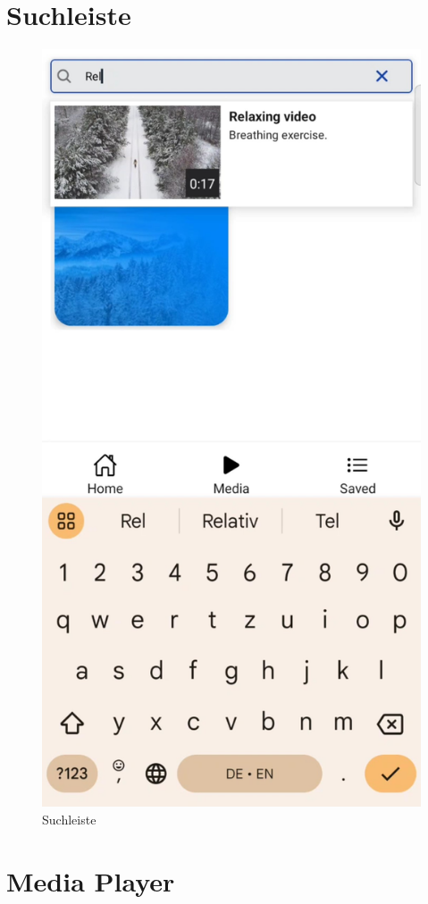 \section{Suchleiste}

\begin{figure}[H]
    \centering
    \includegraphics[height=\textwidth]{./pics/Suche.jpg}
    \caption{Suchleiste}
\end{figure}

\section{Media Player}

